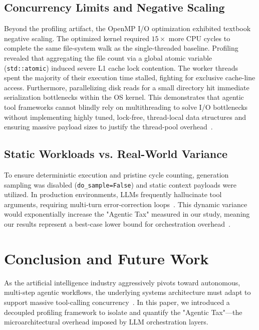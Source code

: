 \documentclass[10pt, letterpaper]{article}
\begin{document}
\subsection{Concurrency Limits and Negative Scaling}
Beyond the profiling artifact, the OpenMP I/O optimization exhibited textbook negative scaling. The optimized kernel required $15\times$ more CPU cycles to complete the same file-system walk as the single-threaded baseline. Profiling revealed that aggregating the file count via a global atomic variable (\texttt{std::atomic}) induced severe L1 cache lock contention. The worker threads spent the majority of their execution time stalled, fighting for exclusive cache-line access. Furthermore, parallelizing disk reads for a small directory hit immediate serialization bottlenecks within the OS kernel. This demonstrates that agentic tool frameworks cannot blindly rely on multithreading to solve I/O bottlenecks without implementing highly tuned, lock-free, thread-local data structures and ensuring massive payload sizes to justify the thread-pool overhead~\cite{cpu_centric}.

\subsection{Static Workloads vs. Real-World Variance}
To ensure deterministic execution and pristine cycle counting, generation sampling was disabled (\texttt{do\_sample=False}) and static context payloads were utilized. In production environments, LLMs frequently hallucinate tool arguments, requiring multi-turn error-correction loops~\cite{ai_nativebench}. This dynamic variance would exponentially increase the "Agentic Tax" measured in our study, meaning our results represent a best-case lower bound for orchestration overhead~\cite{toolcaching}.

\section{Conclusion and Future Work}
\label{sec:conclusion}

As the artificial intelligence industry aggressively pivots toward autonomous, multi-step agentic workflows, the underlying systems architecture must adapt to support massive tool-calling concurrency~\cite{aragog}. In this paper, we introduced a decoupled profiling framework to isolate and quantify the "Agentic Tax"---the microarchitectural overhead imposed by LLM orchestration layers. \\
\end{document}
